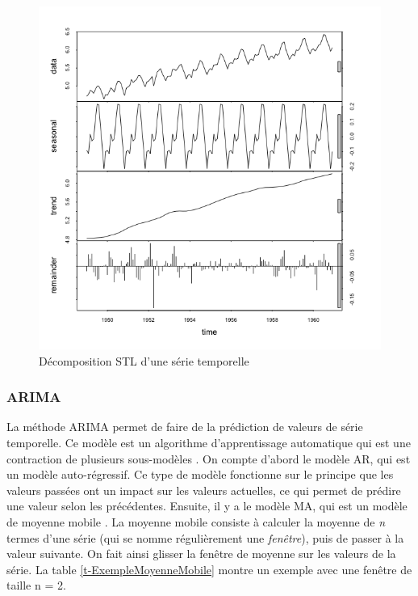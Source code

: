 \documentclass[paper=a4, fontsize=11pt]{scrartcl}
\begin{document}
\begin{figure}[H]
    \centering
    \includegraphics[width=18cm]{img/STL_decomposition.png}
    \caption{Décomposition STL d'une série temporelle \cite{wheeler_anomaly_2018}}
    \label{f-STLDecomposition}
\end{figure}

\subsubsection{ARIMA}

La méthode ARIMA \cite{noauthor_autoregressive_2020} permet de faire de la prédiction de valeurs de série temporelle.
Ce modèle est un algorithme d'apprentissage automatique qui est une contraction de plusieurs \og sous-modèles \fg. On compte d'abord le modèle AR, qui est un modèle auto-régressif. Ce type de modèle fonctionne sur le principe que les valeurs passées ont un impact sur les valeurs actuelles, ce qui permet de prédire une valeur selon les précédentes.\newline
Ensuite, il y a le modèle MA, qui est un modèle de moyenne mobile \cite{noauthor_moyenne_2020}. La moyenne mobile consiste à calculer la moyenne de \textit{n} termes d'une série (qui se nomme régulièrement une \textit{fenêtre}), puis de passer à la valeur suivante. On fait ainsi glisser la fenêtre de moyenne sur les valeurs de la série. La table \ref{t-ExempleMoyenneMobile} montre un exemple avec une fenêtre de taille n = 2.
\end{document}
